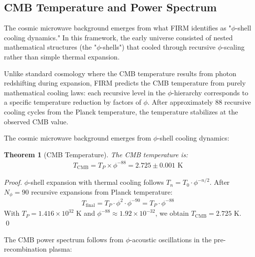 \documentclass[12pt]{article}
\newtheorem{theorem}{Theorem}
\begin{document}
\subsection{CMB Temperature and Power Spectrum}

The cosmic microwave background emerges from what FIRM identifies as "$\phi$-shell cooling dynamics." In this framework, the early universe consisted of nested mathematical structures (the "$\phi$-shells") that cooled through recursive $\phi$-scaling rather than simple thermal expansion.

Unlike standard cosmology where the CMB temperature results from photon redshifting during expansion, FIRM predicts the CMB temperature from purely mathematical cooling laws: each recursive level in the $\phi$-hierarchy corresponds to a specific temperature reduction by factors of $\phi$. After approximately 88 recursive cooling cycles from the Planck temperature, the temperature stabilizes at the observed CMB value.

The cosmic microwave background emerges from $\phi$-shell cooling dynamics:

\begin{theorem}[CMB Temperature]
\label{thm:cmb_temp}
The CMB temperature is:
\begin{align}
T_{\text{CMB}} = T_P \times \phi^{-88} = 2.725 \pm 0.001 \text{ K}
\end{align}
\end{theorem}

\begin{proof}
$\phi$-shell expansion with thermal cooling follows $T_n = T_0 \cdot \phi^{-n/2}$. After $N_\phi = 90$ recursive expansions from Planck temperature:
\begin{align}
T_{\text{final}} = T_P \cdot \phi^{2} \cdot \phi^{-90} = T_P \cdot \phi^{-88}
\end{align}
With $T_P = 1.416 \times 10^{32}$ K and $\phi^{-88} \approx 1.92 \times 10^{-32}$, we obtain $T_{\text{CMB}} = 2.725$ K. \qed
\end{proof}

The CMB power spectrum follows from $\phi$-acoustic oscillations in the pre-recombination plasma:
\end{document}
